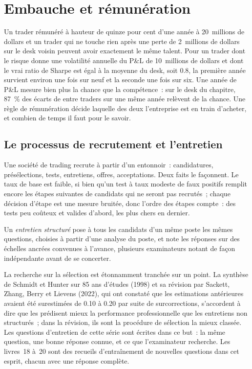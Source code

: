 \chapter{Embauche et rémunération}\label{ch:fm:hiring-and-compensation}

Un trader rémunéré à hauteur de quinze pour cent d'une année à 20~millions de dollars et un trader qui ne touche rien après une perte de 2~millions de dollars sur le desk voisin peuvent avoir
exactement le même talent. Pour un trader dont le risque donne une volatilité annuelle du P\&L de 10~millions de dollars et dont le vrai ratio de Sharpe est égal à la
moyenne du desk, soit 0.8, la première année survient environ une fois sur neuf et la seconde une fois sur six. Une année de P\&L mesure bien plus la chance que la compétence~: sur
le desk du chapitre, 87~\% des écarts de  entre traders sur une même année relèvent de la chance. Une règle de rémunération décide laquelle des deux l'entreprise est en train
d'acheter, et combien de temps il faut pour le savoir.

\section{Le processus de recrutement et l'entretien}

Une société de trading recrute à partir d'un entonnoir~: candidatures, présélections, tests, entretiens, offres, acceptations. Deux faits le façonnent. Le taux de base est faible, si bien qu'un
test à taux modeste de faux positifs remplit encore les étapes suivantes de candidats qui ne seront pas recrutés~; chaque décision d'étape est une mesure
bruitée, donc l'ordre des étapes compte~: des tests peu coûteux et valides d'abord, les plus chers en dernier.

\begin{definition}\label{def:fm:hiring-and-compensation:structured}
Un \emph{entretien structuré} pose à tous les candidats d'un même poste les mêmes questions, choisies à partir d'une analyse du poste,
et note les réponses sur des échelles ancrées convenues à l'avance, plusieurs examinateurs notant de façon indépendante avant de se concerter.
\end{definition}

La recherche sur la sélection est étonnamment tranchée sur un point. La synthèse de Schmidt et Hunter sur 85 ans d'études (1998) et sa révision par
Sackett, Zhang, Berry et Lievens (2022), qui ont constaté que les estimations antérieures avaient été surestimées de 0.10 à 0.20 par suite de surcorrections, s'accordent
à dire que les  prédisent mieux la performance professionnelle que les entretiens non structurés~; dans la révision, ils sont la procédure de sélection la mieux classée.
Les questions d'entretien de cette série sont écrites dans ce but~: la même question, une bonne réponse connue, et ce que l'examinateur
recherche. Les livres~18 à~20 sont des recueils d'entraînement de nouvelles questions dans cet esprit, chacun avec une réponse complète.


